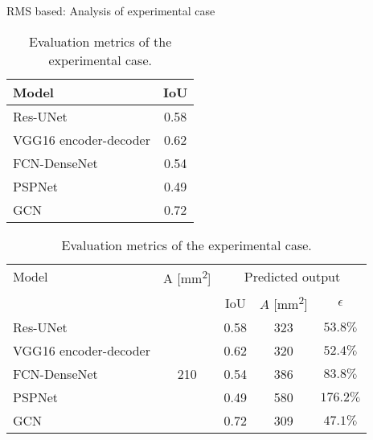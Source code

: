 \documentclass[10pt,aspectratio=169,dvipsnames]{beamer} %
\begin{document}
	\begin{frame}{RMS based: Analysis of experimental case}
		\begin{table}[!ht]
			\centering
			\caption{Evaluation metrics of the experimental case.}
			\label{tab:rms_exp_case}
			\begin{tabular}{lc}
				\toprule[1.5pt]
				Model & IoU  	\\			
				\midrule
				Res-UNet & 0.58 \\ 
				VGG16 encoder-decoder & 0.62 \\ 
				FCN-DenseNet & 0.54 \\ 
				PSPNet & 0.49 \\ 
				GCN & 0.72\\ 
				\bottomrule[1.5pt]
			\end{tabular}		
		\end{table}
					\begin{table}[!ht]
						\centering
						\caption{Evaluation metrics of the experimental case.}
						\label{tab:rms_exp_case}
						\begin{tabular}{l@{\ }cccc}
							\toprule
							\multicolumn{1}{l}{Model} & \multicolumn{1}{c}{A [mm\textsuperscript{2}]} & \multicolumn{3}{c}{Predicted output} \\ 
							\cmidrule(lr){3-5} & & \multicolumn{1}{c}{IoU} & \multicolumn{1}{c}{\(\hat{A}\) [mm\textsuperscript{2}]} & \(\epsilon\) \\ \midrule
							Res-UNet & \multicolumn{1}{c}{\multirow{5}{*}{210}} & \multicolumn{1}{c}{0.58} & \multicolumn{1}{c}{323}  & \(53.8\%\) \\ 
							VGG16 encoder-decoder &  & \multicolumn{1}{c}{0.62} & \multicolumn{1}{c}{320} & \(52.4\%\) 
							\\ 
							FCN-DenseNet &  & \multicolumn{1}{c}{0.54} & \multicolumn{1}{c}{386} & \(83.8\%\) \\ 
							PSPNet &  & \multicolumn{1}{c}{0.49} & \multicolumn{1}{c}{580} & \(176.2\%\) 
							\\ 
							GCN &  & \multicolumn{1}{c}{0.72} & \multicolumn{1}{c}{309} & \(47.1\%\) 
							\\ 
							\bottomrule
						\end{tabular}		
					\end{table}
	\end{frame}
\end{document}
